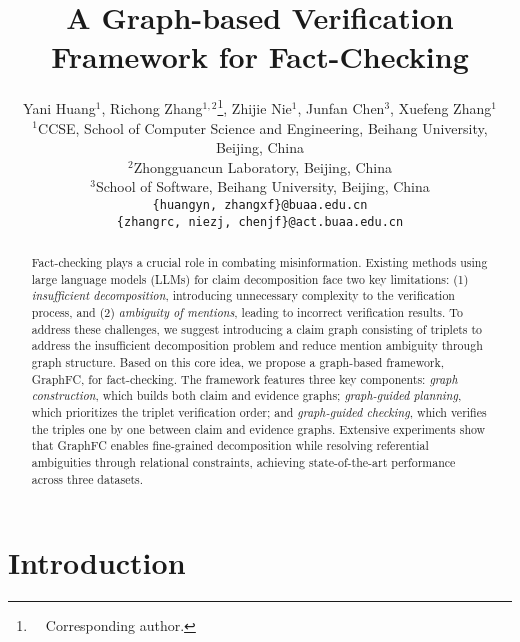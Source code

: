 \title{A Graph-based Verification Framework for Fact-Checking}

\author{
Yani Huang$^{1}$, Richong Zhang$^{1,2}$\thanks{\ \ Corresponding author.}, Zhijie Nie$^{1}$, Junfan Chen$^{3}$, Xuefeng Zhang$^{1}$  \\
$^{1}$CCSE, School of Computer Science and Engineering, Beihang University, Beijing, China \\
$^{2}$Zhongguancun Laboratory, Beijing, China \\
$^{3}$School of Software, Beihang University, Beijing, China \\
\texttt{\{huangyn, zhangxf\}@buaa.edu.cn} \\
\texttt{\{zhangrc, niezj, chenjf\}@act.buaa.edu.cn}
}


\maketitle
\begin{abstract}
Fact-checking plays a crucial role in combating misinformation. Existing methods using large language models (LLMs) for claim decomposition face two key limitations: (1) \textit{insufficient decomposition}, introducing unnecessary complexity to the verification process, and (2) \textit{ambiguity of mentions}, leading to incorrect verification results. To address these challenges, we suggest introducing a claim graph consisting of triplets to address the insufficient decomposition problem and reduce mention ambiguity through graph structure. Based on this core idea, we propose a graph-based framework, GraphFC, for fact-checking. The framework features three key components: \textit{graph construction}, which builds both claim and evidence graphs; \textit{graph-guided planning}, which prioritizes the triplet verification order; and \textit{graph-guided checking}, which verifies the triples one by one between claim and evidence graphs. Extensive experiments show that GraphFC enables fine-grained decomposition while resolving referential ambiguities through relational constraints, achieving state-of-the-art performance across three datasets.

\end{abstract}

\section{Introduction}\label{sec:intro}

